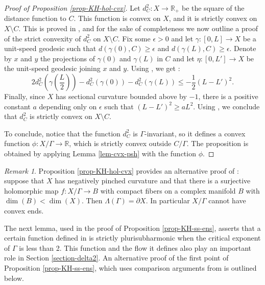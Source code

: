 \documentclass{article}
\theoremstyle{definition}
\theoremstyle{remark}
\newtheorem*{remark}{Remark}
\newcommand{\R}{\mathbb{R}}
\begin{document}
	\begin{proof}[Proof of Proposition \ref{prop-KH-hol-cvx}]
		Let $d_C^{2}:X\to \R_+$ be the square of the distance function to $C$. This function is convex on $X$, and it is strictly convex on $X\setminus C$. This is proved in \cite[Lemma 4.5]{benoistHarmonicQuasiisometricMaps2023}, and for the sake of completeness we now outline a proof of the strict convexity of $d_C^{2}$ on $X\setminus C$. Fix some $\epsilon>0$ and let $\gamma:[0,L]\to X$ be a unit-speed geodesic such that $d(\gamma(0),C)\ge \epsilon$ and $d(\gamma(L),C)\ge \epsilon$. Denote by $x$ and $y$ the projections of $\gamma(0)$ and $\gamma(L)$ in $C$ and let $\eta:[0,L']\to X$ be the unit-speed geodesic joining $x$ and $y$. Using \cite[Corollary 2.1.3 - Formula 2.1(iv)]{korevaarSobolevSpacesHarmonic1993}, we get :\begin{equation*}
			2d_C^{2}\left(\gamma\left(\frac{L}{2}\right)\right) - d_C^{2}(\gamma(0)) - d_C^{2}(\gamma(L)) \le -\frac{1}{2}(L-L')^{2}.
		\end{equation*}
		Finally, since $X$ has sectional curvature bounded above by $-1$, there is a positive constant $a$ depending only on $\epsilon$ such that $(L-L')^{2}\ge aL^{2}$. Using \cite[Lemma 1]{greeneConvexFunctionsManifolds1976manuel}, we conclude that $d_C^{2}$ is strictly convex on $X\setminus C$.
		
		To conclude, notice that the function $d_C^{2}$ is $\Gamma$-invariant, so it defines a convex function $\phi:X/\Gamma\to \R$, which is strictly convex outside $C/\Gamma$. The proposition is obtained by applying Lemma \ref{lem-cvx-psh} with the function $\phi$.
	\end{proof}
	
	\begin{remark}
		Proposition \ref{prop-KH-hol-cvx} provides an alternative proof of \cite[Proposition 5]{kapovichSurveyComplexHyperbolic2022}: suppose that $X$ has negatively pinched curvature and that there is a surjective holomorphic map $f:X/\Gamma \to B$ with compact fibers on a complex manifold $B$ with $\dim(B)<\dim(X)$. Then $\Lambda(\Gamma)=\partial X$. In particular $X/\Gamma$ cannot have convex ends. 
	\end{remark}

	The next lemma, used in the proof of Proposition \ref{prop-KH-ss-ens}, asserts that a certain function defined in \cite{connellNaturalFlowCritical2023} is strictly plurisubharmonic when the critical exponent of $\Gamma$ is less than 2. This function and the flow it defines also play an important role in Section \ref{section-delta2}. An alternative proof of the first point of Proposition \ref{prop-KH-ss-ens}, which uses comparison arguments from \cite{greeneFunctionTheoryManifolds1979} is outlined below. 
	
\end{document}
